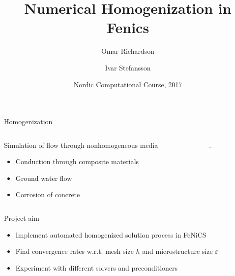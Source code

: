 \documentclass{beamer}
\title[Numerical homogenization]{Numerical Homogenization in Fenics}
\author[O. Richardson \and I. Stefansson] %
{Omar Richardson \and Ivar Stefansson}
\institute %
{
    Karlstad University, Sweden \and University of Bergen, Norway
}
\date[]{Nordic Computational Course, 2017}
\renewcommand{\epsilon}{\varepsilon}
\begin{document}
  \frame{\titlepage}
\begin{frame}{Homogenization}
    \begin{columns}
        \begin{column}[c]{.5\textwidth}
            Simulation of flow through nonhomogeneous media
            \begin{itemize}
              \item Conduction through composite materials
              \item Ground water flow
              \item Corrosion of concrete
            \end{itemize}
        \end{column}
        \begin{column}[c]{.5\textwidth}
            .
        \end{column}
    \end{columns}
\end{frame}

\begin{frame}[c]{Project aim}
    \begin{itemize}
        \item Implement automated homogenized solution process in FeNiCS
        \item Find convergence rates w.r.t. mesh size $h$ and microstructure size $\epsilon$
        \item Experiment with different solvers and preconditioners
    \end{itemize}
\end{frame}
\end{document}

